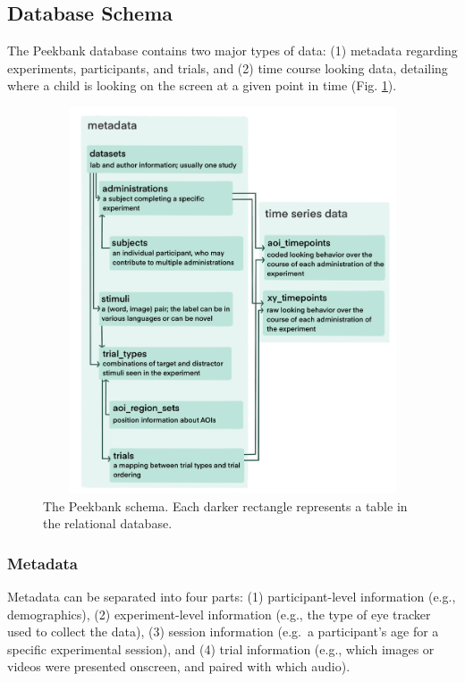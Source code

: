 \documentclass[
  english,
  man,floatsintext]{apa6}
\providecommand{\DIFaddtex}[1]{{\protect\color{blue}{#1}}} %
\providecommand{\DIFaddFL}[1]{\DIFadd{#1}} %
\providecommand{\DIFaddbeginFL}{} %
\providecommand{\DIFaddendFL}{} %
\providecommand{\DIFadd}[1]{\texorpdfstring{\DIFaddtex{#1}}{#1}} %
\newcommand{\DIFaddincludegraphics}[2][]{{\color{blue}\fbox{\DIFOincludegraphics[#1]{#2}}}} %
\DeclareRobustCommand{\DIFaddbeginFL}{\DIFOaddbeginFL \let\includegraphics\DIFaddincludegraphics} %
\DeclareRobustCommand{\DIFaddendFL}{\DIFOaddendFL \let\includegraphics\DIFOincludegraphics} %
\begin{document}
\hypertarget{database-schema}{%
\subsection{Database Schema}\label{database-schema}}

The Peekbank database contains two major types of data: (1) metadata regarding experiments, participants, and trials, and (2) time course looking data, detailing where a child is looking on the screen at a given point in time (Fig. \ref{fig:fig-schema}).

\begin{figure}

{\centering \includegraphics[width=7.31in,height=4.5in]{brm/figures/schema_3}

}

\caption{The Peekbank schema. Each darker rectangle represents a table in the relational database. \DIFaddbeginFL \DIFaddFL{AOIs are areas of interest in an eye-tracking experiment, in this case information about the position of target and distractor stimuli on the screen.}\DIFaddendFL }\label{fig:fig-schema}
\end{figure}

\hypertarget{metadata}{%
\subsubsection{Metadata}\label{metadata}}

Metadata can be separated into four parts: (1) participant-level information (e.g., demographics), (2) experiment-level information (e.g., the type of eye tracker used to collect the data), (3) session information (e.g.~a participant's age for a specific experimental session), and (4) trial information (e.g., which images or videos were presented onscreen, and paired with which audio).
\end{document}
